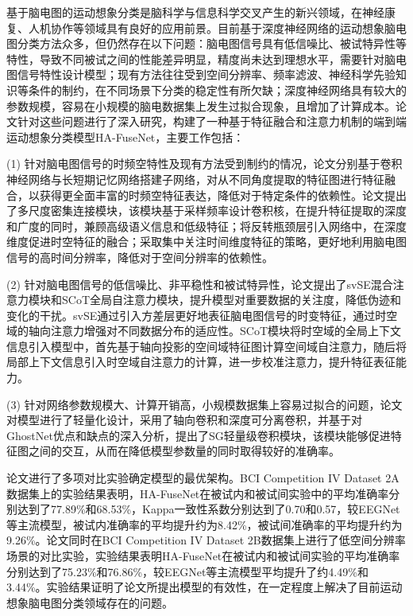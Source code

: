 
基于脑电图的运动想象分类是脑科学与信息科学交叉产生的新兴领域，在神经康复、人机协作等领域具有良好的应用前景。目前基于深度神经网络的运动想象脑电图分类方法众多，但仍然存在以下问题：脑电图信号具有低信噪比、被试特异性等特性，导致不同被试之间的性能差异明显，精度尚未达到理想水平，需要针对脑电图信号特性设计模型；现有方法往往受到空间分辨率、频率滤波、神经科学先验知识等条件的制约，在不同场景下分类的稳定性有所欠缺；深度神经网络具有较大的参数规模，容易在小规模的脑电数据集上发生过拟合现象，且增加了计算成本。论文针对这些问题进行了深入研究，构建了一种基于特征融合和注意力机制的端到端运动想象分类模型HA-FuseNet，主要工作包括：

(1) 针对脑电图信号的时频空特性及现有方法受到制约的情况，论文分别基于卷积神经网络与长短期记忆网络搭建子网络，对从不同角度提取的特征图进行特征融合，以获得更全面丰富的时频空特征表达，降低对于特定条件的依赖性。论文提出了多尺度密集连接模块，该模块基于采样频率设计卷积核，在提升特征提取的深度和广度的同时，兼顾高级语义信息和低级特征；将反转瓶颈层引入网络中，在深度维度促进时空特征的融合；采取集中关注时间维度特征的策略，更好地利用脑电图信号的高时间分辨率，降低对于空间分辨率的依赖性。

(2) 针对脑电图信号的低信噪比、非平稳性和被试特异性，论文提出了svSE混合注意力模块和SCoT全局自注意力模块，提升模型对重要数据的关注度，降低伪迹和变化的干扰。svSE通过引入方差层更好地表征脑电图信号的时变特征，通过时空域的轴向注意力增强对不同数据分布的适应性。SCoT模块将时空域的全局上下文信息引入模型中，首先基于轴向投影的空间域特征图计算空间域自注意力，随后将局部上下文信息引入时空域自注意力的计算，进一步校准注意力，提升特征表征能力。

(3) 针对网络参数规模大、计算开销高，小规模数据集上容易过拟合的问题，论文对模型进行了轻量化设计，采用了轴向卷积和深度可分离卷积，并基于对GhostNet优点和缺点的深入分析，提出了SG轻量级卷积模块，该模块能够促进特征图之间的交互，从而在降低模型参数量的同时取得较好的准确率。

论文进行了多项对比实验确定模型的最优架构。BCI Competition IV Dataset 2A数据集上的实验结果表明，HA-FuseNet在被试内和被试间实验中的平均准确率分别达到了77.89\%和68.53\%，Kappa一致性系数分别达到了0.70和0.57，较EEGNet等主流模型，被试内准确率的平均提升约为8.42\%，被试间准确率的平均提升约为9.26\%。论文同时在BCI Competition IV Dataset 2B数据集上进行了低空间分辨率场景的对比实验，实验结果表明HA-FuseNet在被试内和被试间实验的平均准确率分别达到了75.23\%和76.86\%，较EEGNet等主流模型平均提升了约4.49\%和3.44\%。实验结果证明了论文所提出模型的有效性，在一定程度上解决了目前运动想象脑电图分类领域存在的问题。